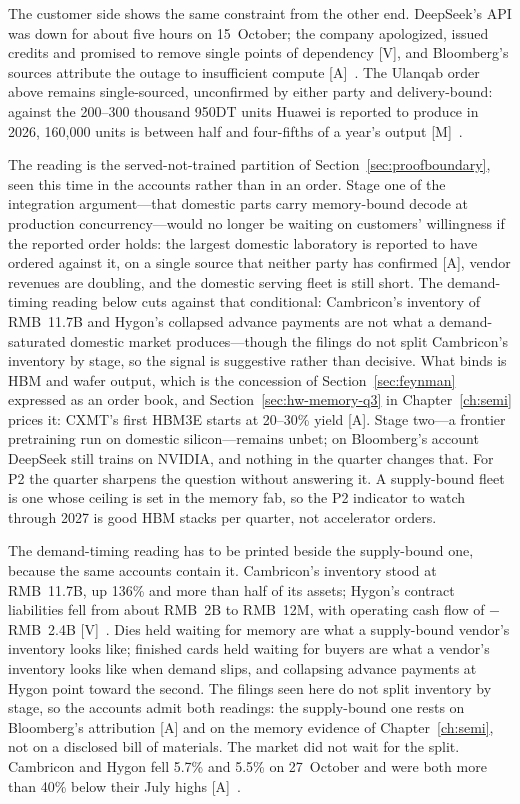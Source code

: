 The customer side shows the same constraint from the other end. DeepSeek's API was down for about five hours on 15~October; the company apologized, issued credits and promised to remove single points of dependency [V], and Bloomberg's sources attribute the outage to insufficient compute [A]~\cite{hw-deepseek-outage}. The Ulanqab order above remains single-sourced, unconfirmed by either party and delivery-bound: against the 200--300 thousand 950DT units Huawei is reported to produce in 2026, 160{,}000 units is between half and four-fifths of a year's output [M]~\cite{deepseek-ascend-order,hw-huawei-connect-2026}.

The reading is the served-not-trained partition of Section~\ref{sec:proofboundary}, seen this time in the accounts rather than in an order. Stage one of the integration argument---that domestic parts carry memory-bound decode at production concurrency---would no longer be waiting on customers' willingness if the reported order holds: the largest domestic laboratory is reported to have ordered against it, on a single source that neither party has confirmed [A], vendor revenues are doubling, and the domestic serving fleet is still short. The demand-timing reading below cuts against that conditional: Cambricon's inventory of RMB~11.7B and Hygon's collapsed advance payments are not what a demand-saturated domestic market produces---though the filings do not split Cambricon's inventory by stage, so the signal is suggestive rather than decisive. What binds is HBM and wafer output, which is the concession of Section~\ref{sec:feynman} expressed as an order book, and Section~\ref{sec:hw-memory-q3} in Chapter~\ref{ch:semi} prices it: CXMT's first HBM3E starts at 20--30\% yield [A]. Stage two---a frontier pretraining run on domestic silicon---remains unbet; on Bloomberg's account DeepSeek still trains on NVIDIA, and nothing in the quarter changes that. For P2 the quarter sharpens the question without answering it. A supply-bound fleet is one whose ceiling is set in the memory fab, so the P2 indicator to watch through 2027 is good HBM stacks per quarter, not accelerator orders.

The demand-timing reading has to be printed beside the supply-bound one, because the same accounts contain it. Cambricon's inventory stood at RMB~11.7B, up 136\% and more than half of its assets; Hygon's contract liabilities fell from about RMB~2B to RMB~12M, with operating cash flow of $-$RMB~2.4B [V]~\cite{hw-cn-chip-equities}. Dies held waiting for memory are what a supply-bound vendor's inventory looks like; finished cards held waiting for buyers are what a vendor's inventory looks like when demand slips, and collapsing advance payments at Hygon point toward the second. The filings seen here do not split inventory by stage, so the accounts admit both readings: the supply-bound one rests on Bloomberg's attribution [A] and on the memory evidence of Chapter~\ref{ch:semi}, not on a disclosed bill of materials. The market did not wait for the split. Cambricon and Hygon fell 5.7\% and 5.5\% on 27~October and were both more than 40\% below their July highs [A]~\cite{hw-cn-chip-equities}.

